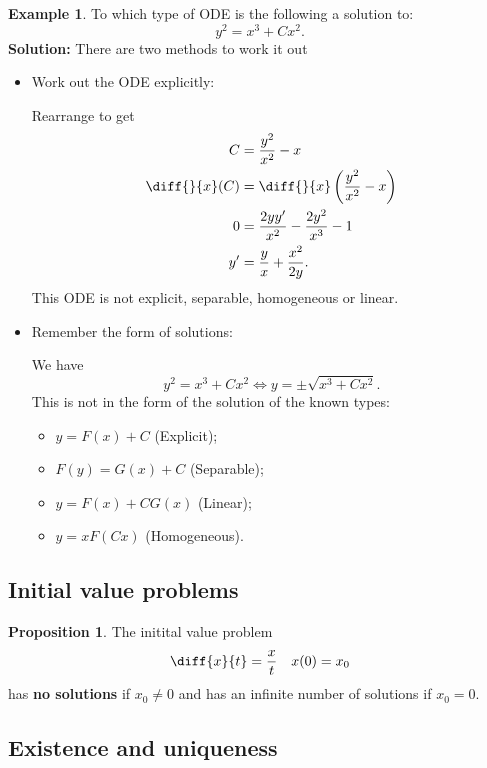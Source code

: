 \documentclass[12pt, a4paper]{article}
\theoremstyle{definition}
\newtheorem*{example}{Example}
\newtheorem{proposition}{Proposition}
\theoremstyle{plain}
\begin{document}
\begin{example}
To which type of ODE is the following a solution to: $$y^2=x^3+Cx^2.$$ \textbf{Solution:} There are two methods to work it out \begin{itemize}

	\item Work out the ODE explicitly:

	Rearrange to get $$\begin{aligned} 
	C &= \frac{y^2}{x^2}-x \\
	\diff{}{x}(C) &= \diff{}{x} \left(\frac{y^2}{x^2}-x\right) \\
	0 &= \frac{2yy'}{x^2}-\frac{2y^2}{x^3}-1 \\
	y'&=\frac{y}{x}+\frac{x^2}{2y}.
	\end{aligned}$$ This ODE is not explicit, separable, homogeneous or linear.

	\item Remember the form of solutions:

	We have $$y^2=x^3+Cx^2 \iff y = \pm \sqrt{x^3+Cx^2}.$$ This is not in the form of the solution of the known types: 
	\begin{itemize}
	
		\item $y=F(x)+C$ (Explicit);

		\item $F(y)=G(x)+C$ (Separable);

		\item $y=F(x)+CG(x)$ (Linear);

		\item $y=xF(Cx)$ (Homogeneous).
	
	\end{itemize}

\end{itemize}
\end{example}

\subsection{Initial value problems}

\begin{proposition}
The initital value problem $$\diff{x}{t}=\frac{x}{t} \quad x(0)=x_0$$ has \textbf{no solutions} if $x_0\neq 0$ and has an infinite number of solutions if $x_0=0.$
\end{proposition}

\subsection{Existence and uniqueness}
\end{document}
